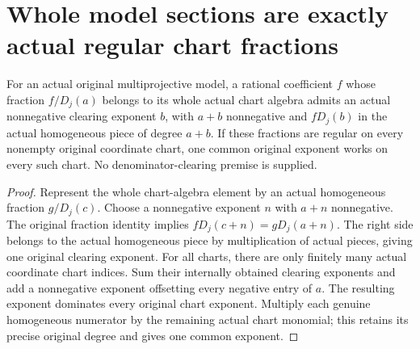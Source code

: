 \section{Whole model sections are exactly actual regular chart fractions}
\label{sec:model-sections-from-chart-fractions}

\begin{lemma}
\label{lem:model-chart-fraction-clearing}
\leanok
{}
For an actual original multiprojective model, a rational coefficient $f$ whose
fraction $f/D_j(a)$ belongs to its whole actual chart algebra admits an actual
nonnegative clearing exponent $b$, with $a+b$ nonnegative and $fD_j(b)$ in the
actual homogeneous piece of degree $a+b$. If these fractions are regular on
every nonempty original coordinate chart, one common original exponent
works on every such chart. No denominator-clearing premise is supplied.
\end{lemma}
\begin{proof}
Represent the whole chart-algebra element by an actual homogeneous fraction
$g/D_j(c)$. Choose a nonnegative exponent $n$ with $a+n$ nonnegative. The original
fraction identity implies $fD_j(c+n)=gD_j(a+n)$. The right side belongs to the
actual homogeneous piece by multiplication of actual pieces, giving one
original clearing exponent. For all charts, there are only finitely many
actual coordinate chart indices. Sum their internally obtained clearing
exponents and add a nonnegative exponent offsetting every negative entry of
$a$. The resulting exponent dominates every original chart exponent. Multiply
each genuine homogeneous numerator by the remaining actual chart monomial;
this retains its precise original degree and gives one common exponent.
\end{proof}

